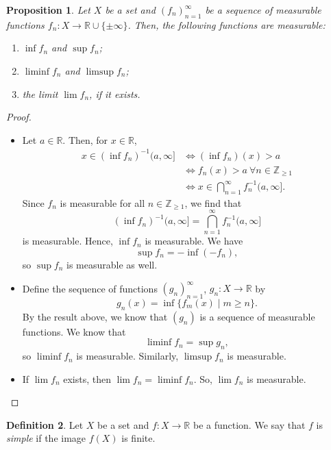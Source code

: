 \documentclass[a4paper, openany]{memoir}
\theoremstyle{definition}
\newtheorem{definition}{Definition}[section]
\theoremstyle{plain}
\newtheorem{proposition}[definition]{Proposition}
\begin{document}
    \begin{proposition}
        Let $X$ be a set and $(f_n)_{n=1}^\infty$ be a sequence of measurable functions $f_n \colon X \to \mathbb{R} \cup \{\pm \infty\}$. Then, the following functions are measurable:
        \begin{enumerate}
            \item $\inf f_n$ and $\sup f_n$;
            \item $\liminf f_n$ and $\limsup f_n$;
            \item the limit $\lim f_n$, if it exists.
        \end{enumerate}
    \end{proposition}
    \begin{proof}
        \hspace*{0pt}
        \begin{itemize}
            \item Let $a \in \mathbb{R}$. Then, for $x \in \mathbb{R}$,
            \begin{align*}
                x \in (\inf f_n)^{-1}(a, \infty] &\iff (\inf f_n)(x) > a \\
                &\iff f_n(x) > a \ \forall n \in \mathbb{Z}_{\geq 1} \\
                &\iff x \in \bigcap_{n=1}^\infty f_n^{-1}(a, \infty].
            \end{align*}
            Since $f_n$ is measurable for all $n \in \mathbb{Z}_{\geq 1}$, we find that 
            \[(\inf f_n)^{-1}(a, \infty] = \bigcap_{n=1}^\infty f_n^{-1}(a, \infty]\]
            is measurable. Hence, $\inf f_n$ is measurable. We have
            \[\sup f_n = -\inf (-f_n),\]
            so $\sup f_n$ is measurable as well.

            \item Define the sequence of functions $(g_n)_{n=1}^\infty$, $g_n \colon X \to \mathbb{R}$ by
            \[g_n(x) = \inf \{f_m(x) \mid m \geq n\}.\]
            By the result above, we know that $(g_n)$ is a sequence of measurable functions. We know that
            \[\liminf f_n = \sup g_n,\]
            so $\liminf f_n$ is measurable. Similarly, $\limsup f_n$ is measurable.
            
            \item If $\lim f_n$ exists, then $\lim f_n = \liminf f_n$. So, $\lim f_n$ is measurable.
        \end{itemize}
    \end{proof}

    \begin{definition}
        Let $X$ be a set and $f \colon X \to \mathbb{R}$ be a function. We say that $f$ is \emph{simple} if the image $f(X)$ is finite.
    \end{definition}
\end{document}
